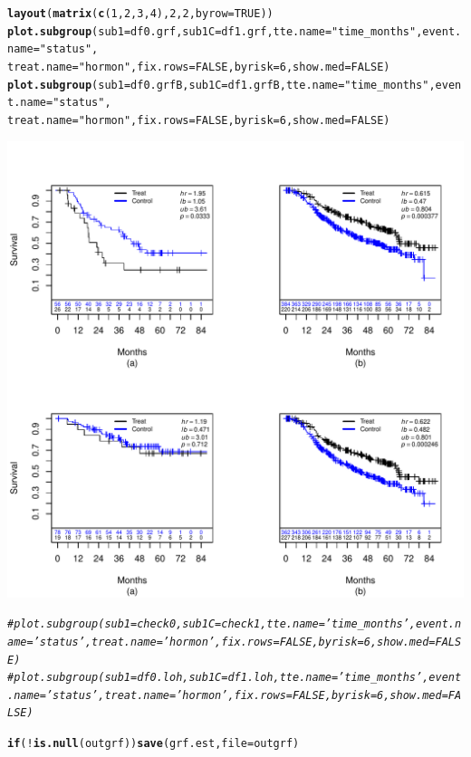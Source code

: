 \documentclass[9pt]{article}\usepackage[]{graphicx}\usepackage[]{xcolor}
\makeatletter
\def\maxwidth{ %
  \ifdim\Gin@nat@width>\linewidth
    \linewidth
  \else
    \Gin@nat@width
  \fi
}
\newcommand{\hlnum}[1]{\textcolor[rgb]{0.686,0.059,0.569}{#1}}%
\newcommand{\hlstr}[1]{\textcolor[rgb]{0.192,0.494,0.8}{#1}}%
\newcommand{\hlcom}[1]{\textcolor[rgb]{0.678,0.584,0.686}{\textit{#1}}}%
\newcommand{\hlopt}[1]{\textcolor[rgb]{0,0,0}{#1}}%
\newcommand{\hlstd}[1]{\textcolor[rgb]{0.345,0.345,0.345}{#1}}%
\newcommand{\hlkwa}[1]{\textcolor[rgb]{0.161,0.373,0.58}{\textbf{#1}}}%
\newcommand{\hlkwc}[1]{\textcolor[rgb]{0.333,0.667,0.333}{#1}}%
\newcommand{\hlkwd}[1]{\textcolor[rgb]{0.737,0.353,0.396}{\textbf{#1}}}%
\newenvironment{kframe}{%
 \def\at@end@of@kframe{}%
 \ifinner\ifhmode%
  \def\at@end@of@kframe{\end{minipage}}%
  \begin{minipage}{\columnwidth}%
 \fi\fi%
 \def\FrameCommand##1{\hskip\@totalleftmargin \hskip-\fboxsep
 \colorbox{shadecolor}{##1}\hskip-\fboxsep
     \hskip-\linewidth \hskip-\@totalleftmargin \hskip\columnwidth}%
 \MakeFramed {\advance\hsize-\width
   \@totalleftmargin\z@ \linewidth\hsize
   \@setminipage}}%
 {\par\unskip\endMakeFramed%
 \at@end@of@kframe}
\newenvironment{knitrout}{}{} %
\theoremstyle{definition}
\theoremstyle{remark}
\makeatother
\begin{document}
\begin{knitrout}
\begin{kframe}
\begin{alltt}
\hlkwd{layout}\hlstd{(}\hlkwd{matrix}\hlstd{(}\hlkwd{c}\hlstd{(}\hlnum{1}\hlstd{,} \hlnum{2}\hlstd{,} \hlnum{3}\hlstd{,} \hlnum{4}\hlstd{),} \hlnum{2}\hlstd{,} \hlnum{2}\hlstd{,} \hlkwc{byrow} \hlstd{=} \hlnum{TRUE}\hlstd{))}
\hlkwd{plot.subgroup}\hlstd{(}\hlkwc{sub1} \hlstd{= df0.grf,} \hlkwc{sub1C} \hlstd{= df1.grf,} \hlkwc{tte.name} \hlstd{=} \hlstr{"time_months"}\hlstd{,} \hlkwc{event.name} \hlstd{=} \hlstr{"status"}\hlstd{,}
    \hlkwc{treat.name} \hlstd{=} \hlstr{"hormon"}\hlstd{,} \hlkwc{fix.rows} \hlstd{=} \hlnum{FALSE}\hlstd{,} \hlkwc{byrisk} \hlstd{=} \hlnum{6}\hlstd{,} \hlkwc{show.med} \hlstd{=} \hlnum{FALSE}\hlstd{)}
\hlkwd{plot.subgroup}\hlstd{(}\hlkwc{sub1} \hlstd{= df0.grfB,} \hlkwc{sub1C} \hlstd{= df1.grfB,} \hlkwc{tte.name} \hlstd{=} \hlstr{"time_months"}\hlstd{,} \hlkwc{event.name} \hlstd{=} \hlstr{"status"}\hlstd{,}
    \hlkwc{treat.name} \hlstd{=} \hlstr{"hormon"}\hlstd{,} \hlkwc{fix.rows} \hlstd{=} \hlnum{FALSE}\hlstd{,} \hlkwc{byrisk} \hlstd{=} \hlnum{6}\hlstd{,} \hlkwc{show.med} \hlstd{=} \hlnum{FALSE}\hlstd{)}
\end{alltt}
\end{kframe}
\includegraphics[width=\maxwidth]{figure/unnamed-chunk-2-1} 
\begin{kframe}\begin{alltt}
\hlcom{# plot.subgroup(sub1=check0,sub1C=check1,tte.name='time_months',event.name='status',treat.name='hormon',fix.rows=FALSE,byrisk=6,show.med=FALSE)}
\hlcom{# plot.subgroup(sub1=df0.loh,sub1C=df1.loh,tte.name='time_months',event.name='status',treat.name='hormon',fix.rows=FALSE,byrisk=6,show.med=FALSE)}

\hlkwa{if} \hlstd{(}\hlopt{!}\hlkwd{is.null}\hlstd{(outgrf))} \hlkwd{save}\hlstd{(grf.est,} \hlkwc{file} \hlstd{= outgrf)}
\end{alltt}
\end{kframe}
\end{knitrout}
\end{document}
